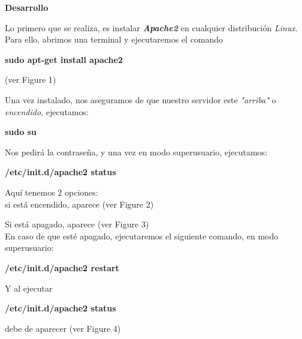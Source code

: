 \documentclass[12pt,letterpaper]{article}
\begin{document}
\newpage
{\Huge {\rm {\bf Desarrollo}}}
\begin{flushleft}
Lo primero que se realiza, es instalar {\em {\bf Apache2}} en cualquier distribuci\'on {\em Linux}. Para ello, abrimos una terminal y ejecutaremos el comando \\

\begin{center}
\fboxsep 12pt
\begin{minipage}[t]{6cm}
{\bf sudo apt-get install apache2}
\end{minipage}
\end{center}
(ver Figure 1)



Una vez instalado, nos aseguramos de que nuestro servidor este {\rm {\em "arriba"}} o {\rm {\em encendido}}, ejecutamos: 
\begin{center}
\fboxsep 12pt
\begin{minipage}[t]{3cm}
{\bf sudo su}
\end{minipage}
\end{center}

Nos pedir\'a la contrase\~na, y una vez en modo superusuario, ejecutamos: 
\begin{center}
\fboxsep 12pt
\begin{minipage}[t]{6cm}
{\bf /etc/init.d/apache2 status}
\end{minipage}
\end{center}

Aqu\'i tenemos 2 opciones:\\si est\'a encendido, aparece (ver Figure 2)%

Si est\'a apagado, aparece (ver Figure 3)%
\\
En caso de que est\'e apagado, ejecutaremos el siguiente comando, en modo superusuario: 
\begin{center}
\fboxsep 12pt
\begin{minipage}[t]{6cm}
{\bf /etc/init.d/apache2 restart}
\end{minipage}
\end{center}
Y al ejecutar
\begin{center}
\fboxsep 12pt
\begin{minipage}[t]{6cm}
{\bf /etc/init.d/apache2 status}
\end{minipage}
\end{center}
debe de aparecer (ver Figure 4)%


\end{flushleft}
\end{document}
